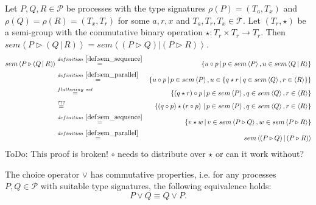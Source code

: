 \begin{myproof}
Let $P, Q, R \in \mathcal{P}$ be processes with the type signatures $\rho \left( P \right) = \left( T_a, T_x \right)$ and $\rho \left( Q \right) = \rho \left( R \right) = \left( T_x, T_r \right)$ for some $a, r, x$ and $T_a, T_r, T_x \in \mathcal{T}$. Let $\left( T_r, \star \right)$ be a semi-group with the commutative binary operation $\star \colon T_r \times T_r \to T_r$. Then $sem \left\langle P \triangleright \left( Q \,|\, R \right) \right\rangle = sem \left\langle \left( P \triangleright Q \right) | \left( P \triangleright R \right) \right\rangle$.
\begin{eqnarray*}
  sem \left\langle P \triangleright \left( Q \,|\, R \right) \right\rangle & \overset{\defref{def:sem_sequence}}{=} & \left\{ u \circ p \,|\, p \in sem \left\langle P \right\rangle, u \in sem \left\langle Q \,|\, R \right\rangle \right\} \\
  & \overset{\defref{def:sem_parallel}}{=} & \left\{ u \circ p \,|\, p \in sem \left\langle P \right\rangle, u \in \left\{q \star r \,|\, q \in sem \left\langle Q \right\rangle, r \in \left\langle R \right\rangle \right\} \right\} \\
  & \overset{flattening \ set}{=} & \left\{ \left( q \star r \right) \circ p \,|\, p \in sem \left\langle P \right\rangle, q \in sem \left\langle Q \right\rangle, r \in \left\langle R \right\rangle \right\} \\
  & \overset{???}{=} & \left\{ \left( q \circ p \right) \star \left( r \circ p \right) \,|\, p \in sem \left\langle P \right\rangle, q \in sem \left\langle Q \right\rangle, r \in \left\langle R \right\rangle \right\} \\
  & \overset{\defref{def:sem_sequence}}{=} & \left\{ v \star w \,|\, v \in sem \left\langle P \triangleright Q \right\rangle, w \in sem \left\langle P \triangleright R \right\rangle \right\} \\
  & \overset{\defref{def:sem_parallel}}{=} & sem \left\langle \left( P \triangleright Q \right) | \left( P \triangleright R \right) \right\rangle
\end{eqnarray*}
ToDo: This proof is broken! $\circ$ needs to distribute over $\star$ or can it work without?
\end{myproof}

\begin{theorem}
\label{thm:commutativity_choice}
The choice operator $\vee$ has commutative properties, i.e. for any processes $P, Q \in \mathcal{P}$ with suitable type signatures, the following equivalence holds:
\begin{equation*}
  P \vee Q \equiv Q \vee P.
\end{equation*}
\end{theorem}

